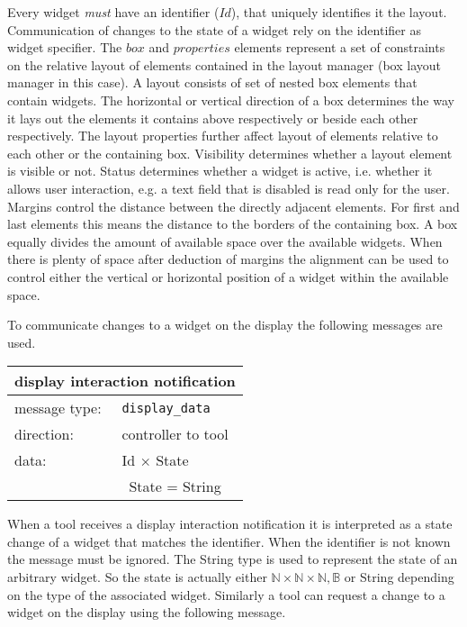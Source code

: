 \documentclass{article}
\newcommand{\msg}[1]{\texttt{#1}}
\begin{document}
   \vspace{-0.4cm}
   \noindent Every widget \emph{must} have an identifier ($Id$), that uniquely
   identifies it the layout. Communication of changes to the state of a widget
   rely on the identifier as widget specifier.  The $box$ and $properties$
   elements represent a set of constraints on the relative layout of elements
   contained in the layout manager (box layout manager in this case). A layout
   consists of set of nested box elements that contain widgets.  The horizontal
   or vertical direction of a box determines the way it lays out the elements
   it contains above respectively or beside each other respectively. The layout
   properties further affect layout of elements relative to each other or the
   containing box. Visibility determines whether a layout element is visible or
   not. Status determines whether a widget is active, i.e.  whether it allows
   user interaction, e.g. a text field that is disabled is read only for the
   user. Margins control the distance between the directly adjacent elements.
   For first and last elements this means the distance to the borders of the
   containing box. A box equally divides the amount of available space over the
   available widgets. When there is plenty of space after deduction of margins
   the alignment can be used to control either the vertical or horizontal
   position of a widget within the available space.

   To communicate changes to a widget on the display the following messages
   are used.

   \begin{table}[H]
    \begin{center}
     \begin{tabular}{|ll|}
      \hline
       \multicolumn{2}{|l|}{\textbf{display interaction notification}} \\
      \hline
       message type:   & \msg{display\_data} \\
      \hline
       direction:      & controller to tool \\
       data:           & Id $\times$ State \\
                       & \ State = String \\
      \hline
     \end{tabular}
    \end{center}
   \vspace{-0.4cm}
   \end{table}

   \noindent When a tool receives a display interaction notification it is
   interpreted as a state change of a widget that matches the identifier. When
   the identifier is not known the message must be ignored. The String type is
   used to represent the state of an arbitrary widget. So the state is actually
   either $\mathbb{N}\times\mathbb{N}\times\mathbb{N}, \mathbb{B}$ or String
   depending on the type of the associated widget.  Similarly a tool can
   request a change to a widget on the display using the following message.
\end{document}
